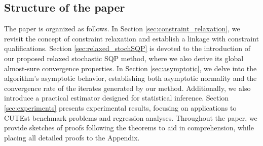 \documentclass[aos]{imsart}
\numberwithin{equation}{section}
\theoremstyle{plain}
\begin{document}
\subsection{Structure of the paper}
The paper is organized as follows. 
In Section \ref{sec:constraint_relaxation}, we revisit the concept of constraint relaxation and establish a linkage with constraint qualifications. Section \ref{sec:relaxed_stochSQP} is devoted to the introduction of our proposed relaxed stochastic SQP method, where we also derive its global almost-sure convergence properties. In Section \ref{sec:asymptotic}, we delve into the algorithm's asymptotic behavior, establishing both asymptotic normality and the convergence rate of the iterates generated by our method. Additionally, we also introduce a practical estimator designed for statistical inference. Section \ref{sec:experiments} presents experimental results, focusing on applications to CUTEst benchmark problems and regression analyses. Throughout the paper, we provide sketches of proofs following the theorems to aid in comprehension, while placing all detailed proofs to the Appendix.
\end{document}
